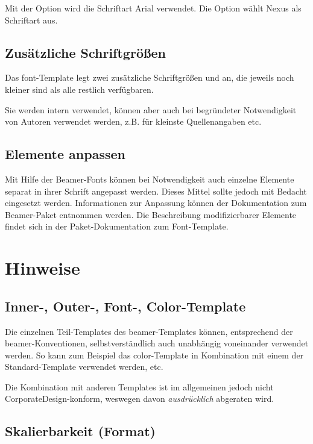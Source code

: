 Mit der Option  wird die Schriftart Arial verwendet.
Die Option  wählt Nexus als Schriftart aus.

\subsection{Zusätzliche Schriftgrößen}

Das font-Template legt zwei zusätzliche Schriftgrößen 
und  an, die jeweils noch kleiner sind als alle restlich
verfügbaren.

Sie werden intern verwendet, können aber auch bei begründeter
Notwendigkeit von Autoren verwendet werden,
z.B. für kleinste Quellenangaben etc.

\subsection{Elemente anpassen}

Mit Hilfe der Beamer-Fonts können bei Notwendigkeit auch einzelne Elemente
separat in ihrer Schrift angepasst werden.
Dieses Mittel sollte jedoch mit Bedacht eingesetzt werden.
Informationen zur Anpassung können der Dokumentation zum Beamer-Paket entnommen
werden. Die Beschreibung modifizierbarer Elemente findet sich in der
Paket-Dokumentation zum Font-Template.

\section{Hinweise}

\subsection{Inner-, Outer-, Font-, Color-Template}

Die einzelnen Teil-Templates des beamer-Templates können,
entsprechend der beamer-Konventionen, selbstverständlich
auch unabhängig voneinander verwendet werden.
So kann zum Beispiel das color-Template in Kombination mit einem der
Standard-Template verwendet werden, etc.

Die Kombination mit anderen Templates ist im allgemeinen jedoch nicht
CorporateDesign-konform, weswegen davon \emph{ausdrücklich} abgeraten wird.

\subsection{Skalierbarkeit (Format)}

